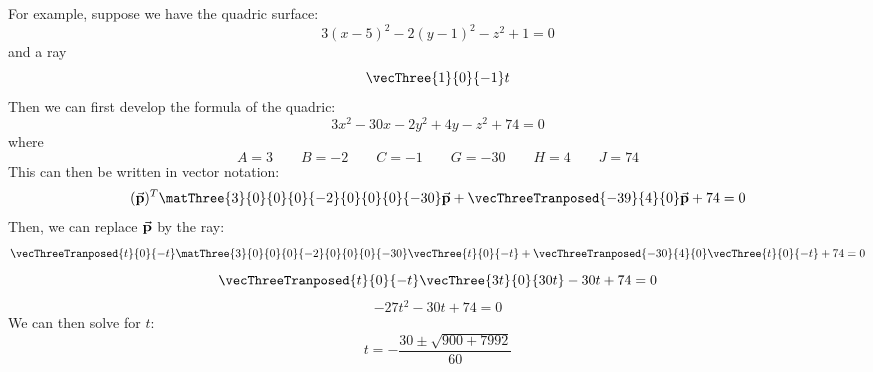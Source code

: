 \documentclass[12pt]{article}
\begin{document}
For example,
suppose we have the quadric surface:
\[ 3(x-5)^2 - 2(y-1)^2 -z^2 + 1 = 0 \]
and a ray
\[ \vecThree{1}{0}{-1}t \]
Then we can first develop the formula of the quadric:
\[ 3x^2 - 30x - 2y^2 +4y -z^2 + 74 = 0 \]
where
\[ 
    A = 3 \qquad B = -2 \qquad C = -1 \qquad G = -30
    \qquad H = 4  \qquad J = 74
\]
This can then be written in vector notation:
\[
    (\bv{p})^T
    \matThree{3}{0}{0}{0}{-2}{0}{0}{0}{-30}
    \bv{p}
    + \vecThreeTranposed{-39}{4}{0}
    \bv{p}
    + 74 = 0
\]
Then, we can replace $\vec{\mathbf{p}}$ by the ray:
\[
    \vecThreeTranposed{t}{0}{-t}
    \matThree{3}{0}{0}{0}{-2}{0}{0}{0}{-30}
    \vecThree{t}{0}{-t}
    + \vecThreeTranposed{-30}{4}{0}
    \vecThree{t}{0}{-t}
    + 74 = 0
\]
\[
    \vecThreeTranposed{t}{0}{-t}
    \vecThree{3t}{0}{30t}
    - 30t + 74 = 0
\]
\[
    -27t^2 - 30t + 74 = 0                                                                                                                                                                                                                                               
\]
We can then solve for $t$:
\[ t = -\dfrac{30 \pm \sqrt{900 + 7992}}{60} \]


 
\end{document}
